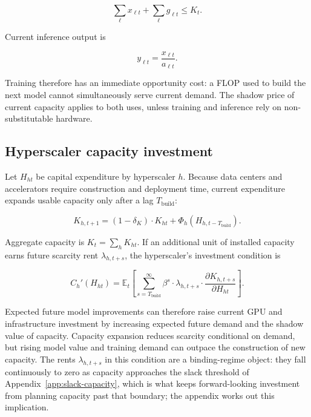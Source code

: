 \documentclass[11pt]{article}
\begin{document}
\begin{equation}\label{eq:agg-constraint}\sum_\ell x_{\ell t}+\sum_\ell g_{\ell t}\leq K_t.\end{equation}

Current inference output is

\begin{equation}y_{\ell t}=\frac{x_{\ell t}}{a_{\ell t}}.\end{equation}

Training therefore has an immediate opportunity cost: a FLOP used to build the next model cannot simultaneously serve current demand. The shadow price of current capacity applies to both uses, unless training and inference rely on non-substitutable hardware.

\subsection{Hyperscaler capacity investment}

Let $H_{ht}$ be capital expenditure by hyperscaler $h$. Because data centers and accelerators require construction and deployment time, current expenditure expands usable capacity only after a lag $T_{\mathrm{build}}$:

\begin{equation}K_{h,t+1}=\left(1-\delta_K\right)\cdot K_{ht}+\Phi_h\left(H_{h,t-T_{\mathrm{build}}}\right).\end{equation}

Aggregate capacity is $K_t=\sum_h K_{ht}$. If an additional unit of installed capacity earns future scarcity rent $\lambda_{h,t+s}$, the hyperscaler's investment condition is

\begin{equation}C_h'(H_{ht})=\mathbb E_t\left[\sum_{s=T_{\mathrm{build}}}^{\infty}\beta^s\cdot\lambda_{h,t+s}\cdot\frac{\partial K_{h,t+s}}{\partial H_{ht}}\right].\end{equation}

Expected future model improvements can therefore raise current GPU and infrastructure investment by increasing expected future demand and the shadow value of capacity. Capacity expansion reduces scarcity conditional on demand, but rising model value and training demand can outpace the construction of new capacity. The rents $\lambda_{h,t+s}$ in this condition are a binding-regime object: they fall continuously to zero as capacity approaches the slack threshold of Appendix~\ref{app:slack-capacity}, which is what keeps forward-looking investment from planning capacity past that boundary; the appendix works out this implication.
\end{document}
